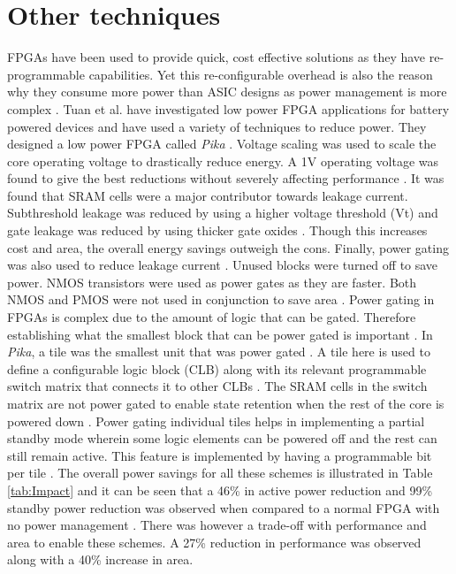 \documentclass[journal]{IEEEtran}
\begin{document}
\section{Other techniques}
FPGAs have been used to provide quick, cost effective solutions as they have re-programmable capabilities. Yet this re-configurable overhead is also the reason why they consume more power than ASIC designs as power management is more complex \cite{FPGA}. Tuan et al. \cite{FPGA} have investigated low power FPGA applications for battery powered devices and have used a variety of techniques to reduce power. They designed a low power FPGA called \textit{Pika} \cite{FPGA}. Voltage scaling was used to scale the core operating voltage to drastically reduce energy. A 1V operating voltage was found to give the best reductions without severely affecting performance \cite{FPGA}. It was found that SRAM cells were a major contributor towards leakage current. Subthreshold leakage was reduced by using a higher voltage threshold (Vt) and gate leakage was reduced by using thicker gate oxides \cite{FPGA}. Though this increases cost and area, the overall energy savings outweigh the cons. Finally, power gating was also used to reduce leakage current \cite{FPGA}. Unused blocks were turned off to save power. NMOS transistors were used as power gates as they are faster. Both NMOS and PMOS were not used in conjunction to save area \cite{FPGA}. Power gating in FPGAs is complex due to the amount of logic that can be gated. Therefore establishing what the smallest block that can be power gated is important \cite{FPGA}. In \textit{Pika}, a tile was the smallest unit that was power gated \cite{FPGA}. A tile here is used to define a configurable logic block (CLB) along with its relevant programmable switch matrix that connects it to other CLBs \cite{FPGA}. The SRAM cells in the switch matrix are not power gated to enable state retention when the rest of the core is powered down \cite{FPGA}. Power gating individual tiles helps in implementing a partial standby mode wherein some logic elements can be powered off and the rest can still remain active. This feature is implemented by having a programmable bit per tile \cite{FPGA}. The overall power savings for all these schemes is illustrated in Table \ref{tab:Impact} and it can be seen that a 46\% in active power reduction and 99\% standby power reduction was observed when compared to a normal FPGA with no power management \cite{FPGA}. There was however a trade-off with performance and area to enable these schemes. A 27\% reduction in performance was observed along with a 40\% increase in area. \cite{FPGA}\\
\end{document}
